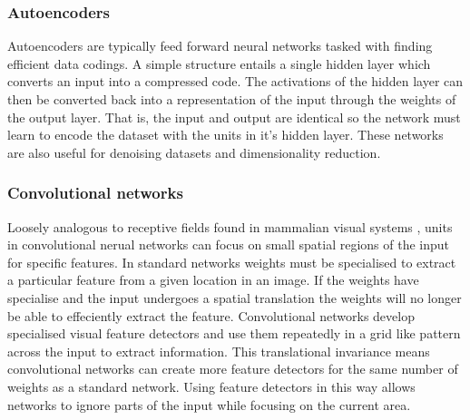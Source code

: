 \subsubsection{Autoencoders}
Autoencoders are typically feed forward neural networks tasked with finding efficient data codings\cite{hinton1994autoencoders}.
A simple structure entails a single hidden layer which converts an input into a compressed code.
The activations of the hidden layer can then be converted back into a representation of the input through the weights of the output layer.  
That is, the input and output are identical so the network must learn to encode the dataset with the units in it's hidden layer. 
These networks are also useful for denoising datasets and dimensionality reduction\cite{hinton2006reducing}.


\subsubsection{Convolutional networks}
Loosely analogous to receptive fields found in mammalian visual systems \cite{hubel1962receptive, hubel1968receptive}, units in convolutional nerual networks can focus on small spatial regions of the input for specific features. 
In standard networks weights must be specialised to extract a particular feature from a given location in an image.
If the weights have specialise and the input undergoes a spatial translation the weights will no longer be able to effeciently extract the feature.
Convolutional networks develop specialised visual feature detectors and use them repeatedly in a grid like pattern across the input to extract information\cite{lecun1998gradient}. 
This translational invariance means convolutional networks can create more feature detectors for the same number of weights as a standard network.
Using feature detectors in this way allows networks to ignore parts of the input while focusing on the current area. 


